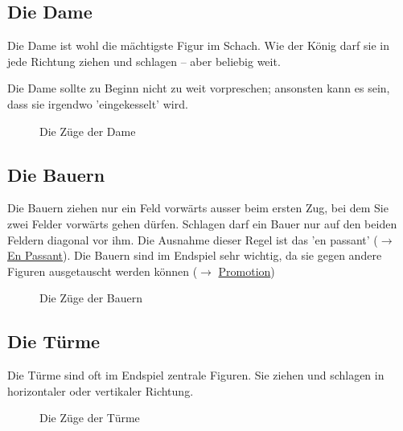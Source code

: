 \documentclass{article}
\begin{document}
\subsection{Die Dame}
\begin{multicols}{2}
Die Dame ist wohl die mächtigste Figur im Schach. Wie der König darf sie in jede Richtung ziehen und schlagen -- aber beliebig weit.

Die Dame sollte zu Beginn nicht zu weit vorpreschen; ansonsten kann es sein, dass sie irgendwo 'eingekesselt' wird.
\vfill\null
\columnbreak
\begin{figure}[H]
\centering
\chessboard[
smallboard,
setpieces={Qe4},
arrow=to,linewidth=0.2ex,
pgfstyle=straightmove,
shortenstart=0.4em,
color=red!80,
markmoves={e4-e8,e4-a8,e4-a4,e4-b1,e4-e1,e4-h1,e4-h4,e4-h7},
]
\caption{Die Züge der Dame}
\end{figure}
\end{multicols}


\subsection{Die Bauern}

\begin{multicols}{2}
Die Bauern ziehen nur ein Feld vorwärts ausser beim ersten Zug, bei dem Sie zwei Felder vorwärts gehen dürfen. Schlagen darf ein Bauer nur auf den beiden Feldern diagonal vor ihm. Die Ausnahme dieser Regel ist das  'en passant' ($\rightarrow$ \hyperref[enpassant]{En Passant}). Die Bauern sind im Endspiel sehr wichtig, da sie gegen andere Figuren ausgetauscht werden können ($\rightarrow$ \hyperref[promotion]{Promotion})
\vfill\null
\columnbreak
\begin{figure}[H]
\centering
\chessboard[
smallboard,
setpieces={Pe4,Pb2,pd5,pf5},
arrow=to,linewidth=0.2ex,
pgfstyle=straightmove,
shortenstart=0.4em,
color=red!80,
markmoves={b2-b4,e4-e5,e4-d5,e4-f5},
]
\caption{Die Züge der Bauern}
\end{figure}

\end{multicols}

\subsection{Die Türme}
\begin{multicols}{2}
Die Türme sind oft im Endspiel zentrale Figuren. Sie ziehen und schlagen in horizontaler oder vertikaler Richtung.
\vfill\null
\columnbreak
\begin{figure}[H]
\centering
\chessboard[
smallboard,
setpieces={Re4},
arrow=to,linewidth=0.2ex,
pgfstyle=straightmove,
shortenstart=0.4em,
color=red!80,
markmoves={e4-e8,e4-e1,e4-a4,e4-h4},
]
\caption{Die Züge der Türme}
\end{figure}
\end{multicols}
\end{document}
